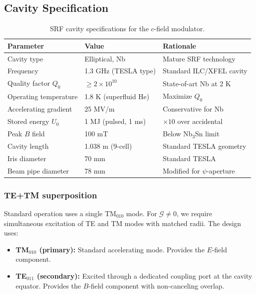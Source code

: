 \documentclass[11pt,letterpaper]{article}
\newcommand{\ee}[1]{\times 10^{#1}}
\begin{document}
\subsection{Cavity Specification}

\begin{table}[H]
\centering
\caption{SRF cavity specifications for the $c$-field modulator.}
\label{tab:cavity_specs}
\begin{tabular}{@{}lll@{}}
\toprule
Parameter & Value & Rationale \\
\midrule
Cavity type & Elliptical, Nb & Mature SRF technology \\
Frequency & 1.3 GHz (TESLA type) & Standard ILC/XFEL cavity \\
Quality factor $Q_0$ & $\geq 2\ee{10}$ & State-of-art Nb at 2 K \\
Operating temperature & 1.8 K (superfluid He) & Maximize $Q_0$ \\
Accelerating gradient & 25 MV/m & Conservative for Nb \\
Stored energy $U_0$ & 1 MJ (pulsed, 1 ms) & $\times 10$ over accidental \\
Peak $B$ field & 100 mT & Below Nb$_3$Sn limit \\
Cavity length & 1.038 m (9-cell) & Standard TESLA geometry \\
Iris diameter & 70 mm & Standard TESLA \\
Beam pipe diameter & 78 mm & Modified for $\psi$-aperture \\
\bottomrule
\end{tabular}
\end{table}

\subsubsection{TE+TM superposition}

Standard operation uses a single TM$_{010}$ mode. For
$\mathcal{G} \neq 0$, we require simultaneous excitation of TE
and TM modes with matched radii. The design uses:

\begin{itemize}
\item \textbf{TM$_{010}$ (primary):} Standard accelerating mode.
Provides the $E$-field component.
\item \textbf{TE$_{011}$ (secondary):} Excited through a dedicated
coupling port at the cavity equator. Provides the $B$-field
component with non-canceling overlap.
\end{itemize}
\end{document}
